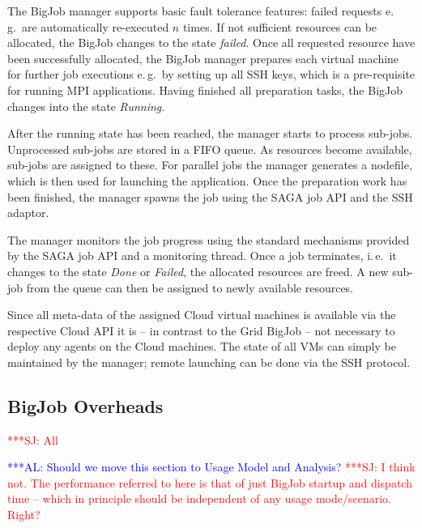 \documentclass[conference,final]{IEEEtran}
\newcommand{\alnote}[1]{ {\textcolor{blue} { ***AL: #1 }}}
\newcommand{\jhanote}[1]{ {\textcolor{red} { ***SJ: #1 }}}
\newcommand{\alnote}[1]{}
\newcommand{\jhanote}[1]{}
\begin{document}
The BigJob manager supports basic fault tolerance features: failed requests e.\,g.\
are automatically re-executed $n$ times. If not sufficient resources can be
allocated, the BigJob changes to the state \emph{failed}.
Once all requested resource have been successfully allocated, the BigJob manager
prepares each virtual machine for further job executions e.\,g.\ by setting
up all SSH keys, which is a pre-requisite for running MPI applications.
Having finished all preparation tasks, the BigJob changes into the state
\emph{Running}. 

After the running state has been reached, the manager starts to process sub-jobs.
Unprocessed sub-jobs are stored in a FIFO queue. As resources become available,
sub-jobs are assigned to these. For parallel jobs the manager generates
a nodefile, which is then used for launching the application. Once the preparation
work has been finished, the manager spawns the job using the SAGA job API and the SSH
adaptor. 

The manager monitors the job progress using the standard mechanisms provided by the
SAGA job API and a monitoring thread. Once a job terminates, i.\,e.\ it changes 
to the state \emph{Done} or \emph{Failed}, the allocated resources are freed. 
A new sub-job from the queue can then be assigned to newly available resources.

Since all meta-data of the assigned Cloud virtual machines is available via 
the respective Cloud API it is -- in contrast to the Grid BigJob -- not necessary 
to deploy any agents on the Cloud machines. The state of all VMs can simply be 
maintained by the manager; remote launching can be done via the SSH protocol.


\subsection{BigJob Overheads} \jhanote{All}

\alnote{Should we move this section to Usage Model and Analysis?}
\jhanote{I think not. The performance referred to here is that of just
  BigJob startup and dispatch time -- which in principle should be
  independent of any usage mode/scenario. Right?}
\end{document}
